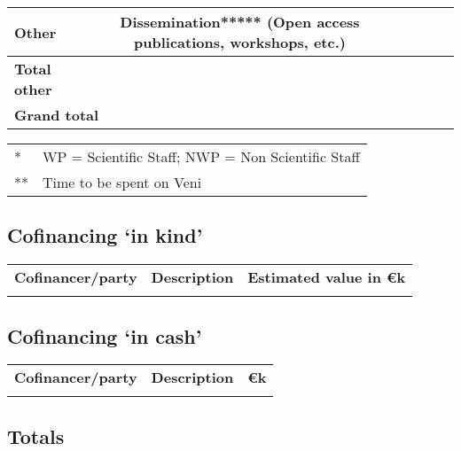 \begin{table}[h!]
\begin{tabular}{p{8.5em}ccccccc}
\hline\hline
\cellcolor[gray]{0.7}\T\B Other & \multicolumn{3}{p{5.7cm}}{Dissemination***** (Open access publications, workshops, etc.)}& & & & \\
\hline \cellcolor[gray]{0.7}\T\B \textbf{Total other} & & & & \textbf{} & \textbf{} & \textbf{} & \textbf{} \\
\hline\hline
\multicolumn{4}{l}{\cellcolor[gray]{0.7}\T\B \textbf{Grand total}} & \textbf{} & \textbf{} & \textbf{} & \textbf{}\\
\hline\hline
\end{tabular}
\begin{minipage}{.95\textwidth}
\scriptsize
\begin{tabular}{p{2em}p{51em}}
* &WP = Scientific Staff; NWP = Non Scientific Staff\\
**& Time to be spent on Veni\\
\end{tabular}
\end{minipage}
\end{table}

\newpage
\subsection{Cofinancing `in kind'}

\begin{table}[h!]
\begin{tabular}{p{9em}p{18em}p{11em}}
\hline\hline
\rowcolor[gray]{0.7}\T\B\textbf{Cofinancer/party}&\textbf{Description}&\textbf{Estimated
value in \euro k}\\
\T\B &&\\
\hline\hline
\end{tabular}
\end{table}

\subsection{Cofinancing `in cash'}

\begin{table}[h!]
\begin{tabular}{p{9em}p{18em}p{11em}}
\hline\hline
\rowcolor[gray]{0.7}\T\B\textbf{Cofinancer/party}&\textbf{Description}&\textbf{\euro k}\\
\T\B &&\\
\hline\hline
\end{tabular}
\end{table}

\subsection{Totals}


